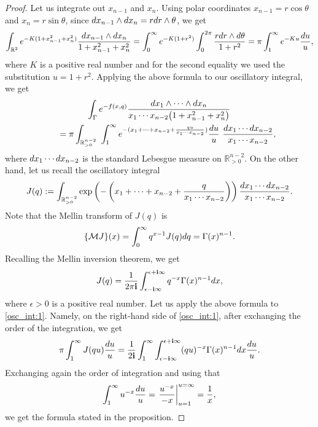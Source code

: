 \documentclass[10pt,a4paper]{article}
\numberwithin{equation}{section}
\newcommand{\RR}{\mathbb{R}}
\newcommand{\ii}{\mathbf{i}}
\begin{document}
\begin{proof}
Let us integrate out $x_{n-1}$ and $x_{n}$. Using polar coordinates
$x_{n-1}= r \cos \theta$ and $x_n=r\sin \theta$, since ${\rm d}x_{n-1}\wedge
{\rm d}x_n=r {\rm d}r\wedge\theta$, we get
\[
\int_{\RR^2} e^{-K (1+x_{n-1}^2+x_n^2)}
\frac{{\rm d}x_{n-1}\wedge {\rm d}x_n}{
1+x_{n-1}^2+x_n^2} =
\int_0^\infty e^{-K(1+r^2)}\int_{0}^{2\pi}
\frac{r {\rm d}r\wedge {\rm d}\theta }{1+r^2} =
\pi \int_1^\infty e^{-Ku} \frac{{\rm d}u}{u},
\]
where $K$ is a positive real number and for the second equality we used
the substitution $u=1+r^2$. Applying the above formula to our
oscillatory integral, we get
\begin{gather}
\int_{\Gamma} e^{-f(x,q)}
\frac{{\rm d}x_1\wedge \cdots \wedge {\rm d}x_n}{
x_1\cdots x_{n-2} \big(1+x_{n-1}^2+x_n^2\big) }\nonumber\\
\qquad = \pi
\int_{\RR^{n-2}_{>0}} \ \int_1^\infty
e^{-(
x_1+\cdots + x_{n-2} + \frac{q u}{ x_1\cdots x_{n-2}} )}
\frac{{\rm d}u}{u}\ \frac{{\rm d}x_1\cdots {\rm d}x_{n-2}}{x_1\cdots x_{n-2}},\label{osc_int:1}
\end{gather}
where ${\rm d}x_1\cdots {\rm d}x_{n-2}$ is the standard Lebesgue measure on
$\RR^{n-2}_{>0}$. On the other hand, let us recall the oscillatory
integral
\[
J(q):= \int_{\RR^{n-2}_{>0}}
\exp\left( -\left(
x_1+\cdots + x_{n-2} + \frac{q}{x_1\cdots x_{n-2}}
\right) \right) \frac{{\rm d}x_1\cdots {\rm d}x_{n-2}}{x_1\cdots x_{n-2}}.
\]
Note that the Mellin transform of $J(q)$ is
\[
\{\mathcal{M}J\}(x) = \int_0^\infty q^{x-1} J(q) {\rm d}q = \Gamma(x)^{n-1}.
\]
Recalling the Mellin inversion theorem, we get
\[
J(q) = \frac{1}{2\pi \ii} \int_{\epsilon-\ii\infty}^{\epsilon+\ii\infty} q^{-x}
\Gamma(x)^{n-1} {\rm d}x,
\]
where $\epsilon>0$ is a positive real number. Let us apply the above
formula to \eqref{osc_int:1}. Namely, on the right-hand side of \eqref{osc_int:1},
after exchanging the order of the integration, we get
\[
\pi \int_1^\infty J(qu) \frac{{\rm d}u}{u} = \frac{1}{2\ii}
\int_1^\infty
\int_{\epsilon-\ii\infty}^{\epsilon+\ii\infty} (q u) ^{-x}
\Gamma(x)^{n-1} {\rm d}x \frac{{\rm d}u}{u}.
\]
Exchanging again the order of integration and using that
\[
\int_1^\infty u^{-x} \frac{{\rm d}u}{u} = \left.
\frac{u^{-x} }{-x}\right|^{u=\infty}_{u=1} = \frac{1}{x},
\]
we get the formula stated in the proposition.
\end{proof}
\end{document}

